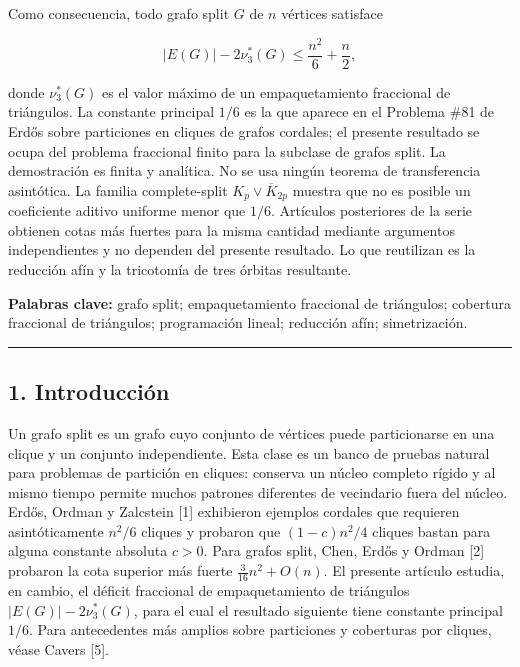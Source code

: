 \documentclass[
  spanish,
  11pt,
  a4paper,
]{article}
\begin{document}
Como consecuencia, todo grafo split \(G\) de \(n\) vértices satisface

\[
\boxed{
|E(G)|-2\nu_3^*(G)\le \frac{n^2}{6}+\frac{n}{2},
}
\]

donde \(\nu_3^*(G)\) es el valor máximo de un empaquetamiento fraccional de triángulos. La constante principal \(1/6\) es la que aparece en el Problema \#81 de Erdős sobre particiones en cliques de grafos cordales; el presente resultado se ocupa del problema fraccional finito para la subclase de grafos split. La demostración es finita y analítica. No se usa ningún teorema de transferencia asintótica. La familia complete-split \(K_p\vee\overline{K}_{2p}\) muestra que no es posible un coeficiente aditivo uniforme menor que \(1/6\). Artículos posteriores de la serie obtienen cotas más fuertes para la misma cantidad mediante argumentos independientes y no dependen del presente resultado. Lo que reutilizan es la reducción afín y la tricotomía de tres órbitas resultante.

\textbf{Palabras clave:} grafo split; empaquetamiento fraccional de triángulos; cobertura fraccional de triángulos; programación lineal; reducción afín; simetrización.

\begin{center}\rule{0.5\linewidth}{0.5pt}\end{center}

\subsection{1. Introducción}\label{introducciuxf3n}

Un grafo split es un grafo cuyo conjunto de vértices puede particionarse en una clique y un conjunto independiente. Esta clase es un banco de pruebas natural para problemas de partición en cliques: conserva un núcleo completo rígido y al mismo tiempo permite muchos patrones diferentes de vecindario fuera del núcleo. Erdős, Ordman y Zalcstein {[}1{]} exhibieron ejemplos cordales que requieren asintóticamente \(n^2/6\) cliques y probaron que \((1-c)n^2/4\) cliques bastan para alguna constante absoluta \(c>0\). Para grafos split, Chen, Erdős y Ordman {[}2{]} probaron la cota superior más fuerte \(\frac{3}{16}n^2+O(n)\). El presente artículo estudia, en cambio, el déficit fraccional de empaquetamiento de triángulos \(|E(G)|-2\nu_3^*(G)\), para el cual el resultado siguiente tiene constante principal \(1/6\). Para antecedentes más amplios sobre particiones y coberturas por cliques, véase Cavers {[}5{]}.
\end{document}
